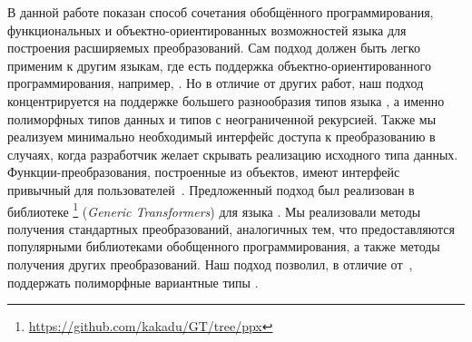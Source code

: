 \!\!\!В данной работе показан способ сочетания обобщённого программирования, функциональных и объектно-ориентированных возможностей  языка \OCaml{} для построения расширяемых преобразований. Сам подход должен быть легко применим  к другим языкам, где есть поддержка объектно-ориентированного программирования, например, \Scala{}.  
Но в отличие от других работ, наш подход концентрируется на поддержке большего разнообразия типов языка \OCaml{}, а именно полиморфных типов данных и типов с неограниченной рекурсией.
Также мы реализуем  минимально необходимый интерфейс доступа к преобразованию в  случаях, когда разработчик желает скрывать реализацию исходного типа данных.
Функции-преобразования, построенные из объектов, имеют интерфейс привычный для пользователей~\cite{ppxderiving}.
Предложенный подход был реализован в  библиотеке \GT{}\footnote{\url{https://github.com/kakadu/GT/tree/ppx}} (\emph{Generic Transformers}) для языка \ocaml{}. Мы  реализовали методы получения стандартных преобразований, аналогичных тем, что предоставляются популярными библиотеками обобщенного программирования, а также методы получения других преобразований.
Наш подход позволил, в отличие от~\cite{Visitors},  поддержать полиморфные вариантные типы  \ocaml{}. 


